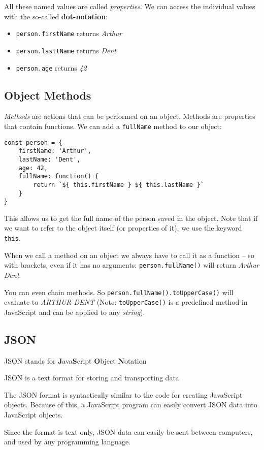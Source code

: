 \documentclass[11pt,a4paper]{report}
\begin{document}
All these named values are called \emph{properties}. We can access the individual values with the so-called {\bf dot-notation}: 
\begin{itemize}
\item \verb|person.firstName| returns \emph{Arthur}
\item \verb|person.lasttName| returns \emph{Dent}
\item \verb|person.age| returns \emph{42}
\end{itemize}

\subsection{Object Methods}

\emph{Methods} are actions that can be performed on an object. Methods are properties that contain functions. We can add a \verb|fullName| method to our object:
\begin{verbatim}
const person = {
    firstName: 'Arthur', 
    lastName: 'Dent', 
    age: 42,
    fullName: function() {
        return `${ this.firstName } ${ this.lastName }`
    }
}
\end{verbatim}

This allows us to get the full name of the person saved in the object. Note that if we want to refer to the object itself (or properties of it), we use the keyword \verb|this|. 

When we call a method on an object we always have to call it as a function -- so with brackets, even if it has no arguments: \verb|person.fullName()| will return \emph{Arthur Dent}.

You can even chain methods. So \verb|person.fullName().toUpperCase()| will evaluate to \emph{ARTHUR DENT} (Note: \verb|toUpperCase()| is a predefined method in JavaScript and can be applied to any \emph{string}).

\subsection{JSON} 
JSON stands for {\bf J}ava{\bf S}cript {\bf O}bject {\bf N}otation

JSON is a text format for storing and transporting data

The JSON format is syntactically similar to the code for creating JavaScript objects. Because of this, a JavaScript program can easily convert JSON data into JavaScript objects.

Since the format is text only, JSON data can easily be sent between computers, and used by any programming language.
\end{document}

